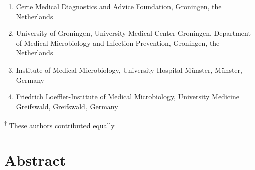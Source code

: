 \documentclass[
]{book}
\providecommand{\tightlist}{%
  \setlength{\itemsep}{0pt}\setlength{\parskip}{0pt}}
\begin{document}
\begin{enumerate}
\def\labelenumi{\arabic{enumi}.}
\tightlist
\item
  Certe Medical Diagnostics and Advice Foundation, Groningen, the Netherlands
\item
  University of Groningen, University Medical Center Groningen, Department of Medical Microbiology and Infection Prevention, Groningen, the Netherlands
\item
  Institute of Medical Microbiology, University Hospital Münster, Münster, Germany
\item
  Friedrich Loeffler-Institute of Medical Microbiology, University Medicine Greifswald, Greifswald, Germany
\end{enumerate}

\textsuperscript{‡} These authors contributed equally

\hypertarget{abstract-5}{%
\section{Abstract}\label{abstract-5}}
\end{document}
